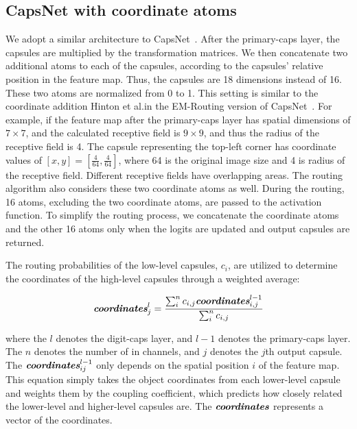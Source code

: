 \documentclass{article}
\begin{document}
\subsection{CapsNet with coordinate atoms \label{sec:caps}}
We adopt a similar architecture to CapsNet~\cite{sabour2017dynamic}. After the primary-caps layer, the capsules are multiplied by the transformation matrices. We then concatenate two additional atoms to each of the capsules, according to the capsules' relative position in the feature map. Thus, the capsules are 18 dimensions instead of 16. These two atoms are normalized from 0 to 1. This setting is similar to the coordinate addition Hinton et al.\performed in the EM-Routing version of CapsNet~\cite{46653}. For example, if the feature map after the primary-caps layer has spatial dimensions of $7\times7$, and the calculated receptive field is $9\times9$, and thus the radius of the receptive field is 4. The capsule representing the top-left corner has coordinate values of $[x,y] = [\frac{4}{64}, \frac{4}{64}]$, where 64 is the original image size and 4 is radius of the receptive field. Different receptive fields have overlapping areas. The routing algorithm also considers these two coordinate atoms as well. During the routing, 16 atoms, excluding the two coordinate atoms, are passed to the activation function. To simplify the routing process, we concatenate the coordinate atoms and the other 16 atoms only when the logits are updated and output capsules are returned.   

The routing probabilities of the low-level capsules, $c_{i}$, are utilized to determine the coordinates of the high-level capsules through a weighted average: 

\begin{equation} \label{equ:1}
\textit{\textbf{coordinates}}_{j}^{l} = \frac{\sum_{i}^{n}c_{i,j}\textit{\textbf{coordinates}}_{i,j}^{l-1}}{\sum_{i}^{n}c_{i,j}}
\end{equation}

\noindent
where the $l$ denotes the digit-caps layer, and $l-1$ denotes the primary-caps layer. The $n$ denotes the number of in channels, and $j$ denotes the $j$th output capsule. The $\textit{\textbf{coordinates}}_{ij}^{l-1}$ only depends on the spatial position $i$ of the feature map. This equation simply takes the object coordinates from each lower-level capsule and weights them by the coupling coefficient, which predicts how closely related the lower-level and higher-level capsules are. The $\textit{\textbf{coordinates}}$ represents a vector of the coordinates. 
\end{document}
